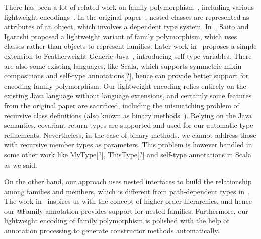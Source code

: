 There has been a lot of related work on family polymorphism~\cite{ernst2001family}, including various lightweight encodings~\cite{Kamina:2007:LSC:1289971.1289996,saito2007essence,igarashi2005lightweight,Kamina:2008:LDC:1449913.1449932}. In the original
paper~\cite{ernst2001family}, nested classes are represented as attributes of an object, which involves a dependent type system. In~\cite{igarashi2005lightweight}, Saito and Igarashi
proposed a lightweight variant of family polymorphism, which uses classes rather than objects to represent families. Later work in~\cite{igarashi2005lightweight}
proposes a simple extension to Featherweight Generic Java~\cite{Igarashi:2001:FJM:503502.503505}, introducing self-type variables. There are also some existing languages,
like Scala, which supports symmetric mixin compositions and self-type annotations[?], hence can provide better support for encoding family
polymorphism. Our lightweight encoding relies entirely on the existing Java language without language extensions, and certainly some features from
the original paper are sacrificed, including the mismatching problem of recursive class definitions (also known as binary methods~\cite{bruce1995binary}). Relying
on the Java semantics, covariant return types are supported and used for our automatic type refinements. Nevertheless, in the case of binary methods,
we cannot address those with recursive member types as parameters. This problem is however handled in some other work like MyType[?], ThisType[?] and self-type
annotations in Scala as we said.

On the other hand, our approach uses nested interfaces to build the relationship among families and members, which is different from
path-dependent types in~\cite{ernst2001family}. The work in~\cite{ernst2003higher} inspires us with the concept of higher-order hierarchies, and hence our \textsf{@Family} annotation
provides support for nested families. Furthermore, our lightweight encoding of family polymorphism is polished with the help of annotation processing
to generate constructor methods automatically.



